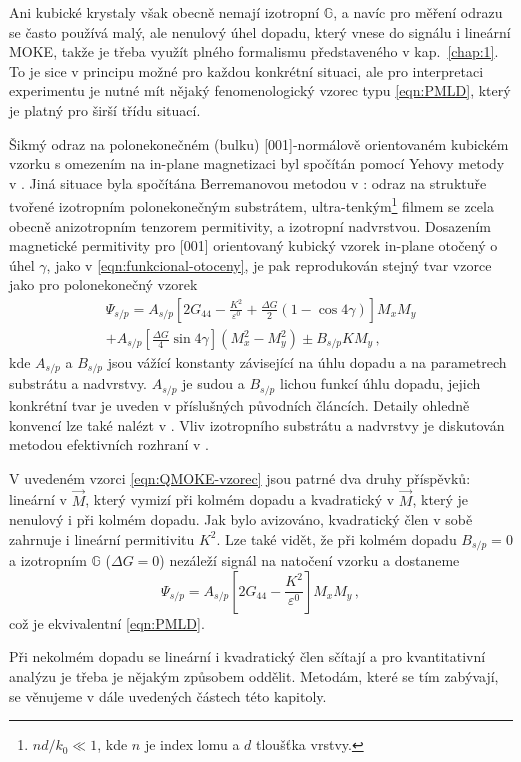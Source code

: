 Ani kubické krystaly však obecně nemají izotropní $\mathbb{G}$\cite{hamrlovaQuadraticinmagnetizationPermittivityConductivity2013}, a navíc pro měření odrazu se často používá malý, ale nenulový úhel dopadu, který vnese do signálu i lineární MOKE, takže je třeba využít plného formalismu představeného v kap.~\ref{chap:1}.
To je sice v principu možné pro každou konkrétní situaci, ale pro interpretaci experimentu je nutné mít nějaký fenomenologický vzorec typu \eqref{eqn:PMLD}, který je platný pro širší třídu situací.

Šikmý odraz na polonekonečném (bulku) [001]-normálově orientovaném kubickém vzorku s omezením na in-plane magnetizaci byl spočítán pomocí Yehovy metody v \cite{postavaAnisotropyQuadraticMagnetooptic2002}.
Jiná situace byla spočítána Berremanovou metodou v \cite{hamrleVicinalInterfaceSensitive2003}: odraz na struktuře tvořené izotropním polonekonečným substrátem,
ultra-tenkým\footnote{$nd/k_0 \ll 1$, kde $n$ je index lomu a $d$ tloušťka vrstvy.}
filmem se zcela obecně anizotropním tenzorem permitivity, a izotropní nadvrstvou.
Dosazením magnetické permitivity pro [001] orientovaný kubický vzorek in-plane otočený o úhel $\gamma$, jako v \eqref{eqn:funkcional-otoceny}, je pak reprodukován stejný tvar vzorce jako pro polonekonečný vzorek
\begin{multline} 
\label{eqn:QMOKE-vzorec}
    \Psi_{s/p}=
     A_{s/p} \left[ 2G_{44}-\frac{K^2}{\varepsilon^0}+\frac{\Delta G}{2}(1-\cos 4\gamma)  \right] M_x M_y\\
     + A_{s/p} \left[ \frac{\Delta G}{4}\sin 4\gamma  \right] \left(M_x^2-M_y^2\right) \pm B_{s/p} K M_y \,,
\end{multline}
kde $A_{s/p}$ a $B_{s/p}$ jsou vážící konstanty závisející na úhlu dopadu a na parametrech substrátu a nadvrstvy. 
$A_{s/p}$ je sudou a $B_{s/p}$ lichou funkcí úhlu dopadu, jejich konkrétní tvar je uveden v příslušných původních článcích\cite{postavaAnisotropyQuadraticMagnetooptic2002,hamrleVicinalInterfaceSensitive2003}.
Detaily ohledně konvencí lze také nalézt v \cite{silberQuadraticMagnetoopticKerr2019a}.
Vliv izotropního substrátu a nadvrstvy je diskutován metodou efektivních rozhraní v \cite{visnovskyPolarMagnetoopticsSimple1995}. 

V uvedeném vzorci \eqref{eqn:QMOKE-vzorec} jsou patrné dva druhy příspěvků: lineární v $\vec{M}$, který vymizí při kolmém dopadu a kvadratický v $\vec{M}$, který je nenulový i při kolmém dopadu.
Jak bylo avizováno, kvadratický člen v sobě zahrnuje i lineární permitivitu $K^2$.
Lze také vidět, že při kolmém dopadu $B_{s/p}=0$ a izotropním $\mathbb{G}$ ($\Delta G=0$) nezáleží signál na natočení vzorku a dostaneme
\begin{equation}
    \Psi_{s/p}=A_{s/p} \left[ 2G_{44}-\frac{K^2}{\varepsilon^0}  \right] M_x M_y \,,
\end{equation}
což je ekvivalentní \eqref{eqn:PMLD}.

Při nekolmém dopadu se lineární i kvadratický člen sčítají a pro kvantitativní analýzu je třeba je nějakým způsobem oddělit.
Metodám, které se tím zabývají, se věnujeme v dále uvedených částech této kapitoly.

